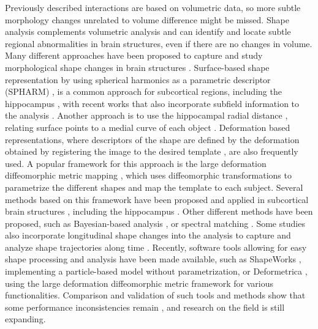 Previously described interactions are based on volumetric data, so more subtle morphology changes unrelated to volume difference might be missed. Shape analysis complements volumetric analysis and can identify and locate subtle regional abnormalities in brain structures, even if there are no changes in volume. Many different approaches have been proposed to capture and study morphological shape changes in brain structures \cite{Nitzken2014,Zhang2016,Shen2017a}. Surface-based shape representation by using spherical harmonics as a parametric descriptor (SPHARM) \cite{Styner2006}, is a common approach for subcortical regions, including the hippocampus \cite{Shen2003,Styner2004,Shi2007,Zhao2008}, with recent works that also incorporate subfield information to the analysis \cite{Cong2015,Inlow2016}. Another approach is to use the hippocampal radial distance \cite{Thompson2004}, relating surface points to a medial curve of each object \cite{Bouix2005,Morra2009,Apostolova2010,Costafreda2011,Chung2010}. Deformation based representations, where descriptors of the shape are defined by the deformation obtained by registering the image to the desired template \cite{Kim2015a,Joshi2016}, are also frequently used. A popular framework for this approach is the large deformation diffeomorphic metric mapping \cite{Beg2005,Miller2006}, which uses diffeomorphic transformations to parametrize the different shapes and map the template to each subject. Several methods based on this framework have been proposed and applied in subcortical brain structures \cite{Vaillant2007,Durrleman2014,Singh2014,Younes2014,Miller2015,Li2017f}, including the hippocampus \cite{Qiu2009,Tang2016,Cury2018}. Other different methods have been proposed, such as Bayesian-based analysis \cite{Gori2017,Gutierrez2019}, or spectral matching \cite{Shakeri2016a}. Some studies also incorporate longitudinal shape changes into the analysis to capture and analyze shape trajectories along time \cite{Miller2015,Bone2018,Cury2019a}. Recently, software tools allowing for easy shape processing and analysis have been made available, such as ShapeWorks \cite{Cates2017}, implementing a particle-based model without parametrization, or Deformetrica \cite{Bone2018a}, using the large deformation diffeomorphic metric framework for various functionalities. Comparison and validation of such tools and methods show that some performance inconsistencies remain \cite{Madan2017,Gao2014,Goparaju2018}, and research on the field is still expanding. \\

